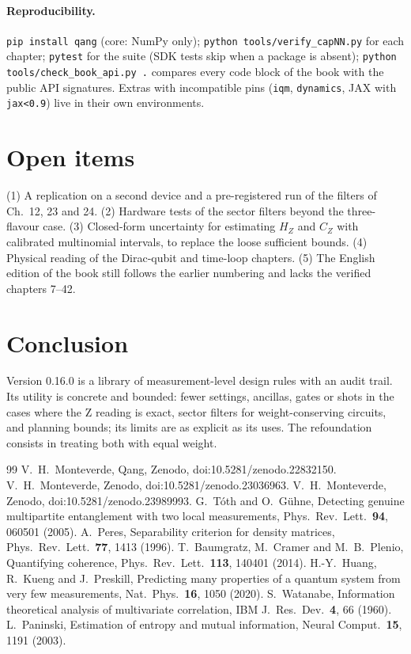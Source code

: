 \documentclass[11pt]{article}
\begin{document}
\paragraph{Reproducibility.} \texttt{pip install qang} (core: NumPy only); \texttt{python tools/verify\_capNN.py} for each chapter; \texttt{pytest} for the suite (SDK tests skip when a package is absent); \texttt{python tools/check\_book\_api.py .} compares every code block of the book with the public API signatures. Extras with incompatible pins (\texttt{iqm}, \texttt{dynamics}, JAX with \texttt{jax<0.9}) live in their own environments.

\section{Open items}
(1) A replication on a second device and a pre-registered run of the filters of Ch.~12, 23 and 24. (2) Hardware tests of the sector filters beyond the three-flavour case. (3) Closed-form uncertainty for estimating $H_Z$ and $C_Z$ with calibrated multinomial intervals, to replace the loose sufficient bounds. (4) Physical reading of the Dirac-qubit and time-loop chapters. (5) The English edition of the book still follows the earlier numbering and lacks the verified chapters 7--42.

\section{Conclusion}
Version 0.16.0 is a library of measurement-level design rules with an audit trail. Its utility is concrete and bounded: fewer settings, ancillas, gates or shots in the cases where the Z reading is exact, sector filters for weight-conserving circuits, and planning bounds; its limits are as explicit as its uses. The refoundation consists in treating both with equal weight.

\begin{thebibliography}{99}\footnotesize
{} V.~H.~Monteverde, Qang, Zenodo, doi:10.5281/zenodo.22832150.
 V.~H.~Monteverde, Zenodo, doi:10.5281/zenodo.23036963.
 V.~H.~Monteverde, Zenodo, doi:10.5281/zenodo.23989993.
 G.~T\'oth and O.~G\"uhne, Detecting genuine multipartite entanglement with two local measurements, Phys.\ Rev.\ Lett.\ \textbf{94}, 060501 (2005).
 A.~Peres, Separability criterion for density matrices, Phys.\ Rev.\ Lett.\ \textbf{77}, 1413 (1996).
 T.~Baumgratz, M.~Cramer and M.~B.~Plenio, Quantifying coherence, Phys.\ Rev.\ Lett.\ \textbf{113}, 140401 (2014).
 H.-Y.~Huang, R.~Kueng and J.~Preskill, Predicting many properties of a quantum system from very few measurements, Nat.\ Phys.\ \textbf{16}, 1050 (2020).
 S.~Watanabe, Information theoretical analysis of multivariate correlation, IBM J.\ Res.\ Dev.\ \textbf{4}, 66 (1960).
 L.~Paninski, Estimation of entropy and mutual information, Neural Comput.\ \textbf{15}, 1191 (2003).
\end{thebibliography}
\end{document}
